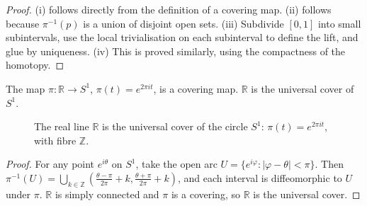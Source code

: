 \begin{proof}
(i) follows directly from the definition of a covering map. (ii) follows because $\pi^{-1}(p)$ is a union of disjoint open sets. (iii) Subdivide $[0,1]$ into small subintervals, use the local trivialisation on each subinterval to define the lift, and glue by uniqueness. (iv) This is proved similarly, using the compactness of the homotopy.
\end{proof}

\begin{theorem}\label{thm:covering_R_S1}
The map $\pi: \mathbb{R} \to S^1$, $\pi(t) = e^{2\pi i t}$, is a covering map. $\mathbb{R}$ is the universal cover of $S^1$.
\end{theorem}

\begin{figure}[htbp]
\centering
{}
\caption{The real line $\mathbb{R}$ is the universal cover of the circle $S^1$: $\pi(t)=e^{2\pi i t}$, with fibre $\mathbb{Z}$.}
\label{fig:covering_R_S1}
\end{figure}

\begin{proof}
For any point $e^{i\theta}$ on $S^1$, take the open arc $U = \{e^{i\varphi} : |\varphi - \theta| < \pi\}$. Then $\pi^{-1}(U) = \bigcup_{k \in \mathbb{Z}} (\frac{\theta - \pi}{2\pi} + k, \frac{\theta + \pi}{2\pi} + k)$, and each interval is diffeomorphic to $U$ under $\pi$. $\mathbb{R}$ is simply connected and $\pi$ is a covering, so $\mathbb{R}$ is the universal cover.
\end{proof}

